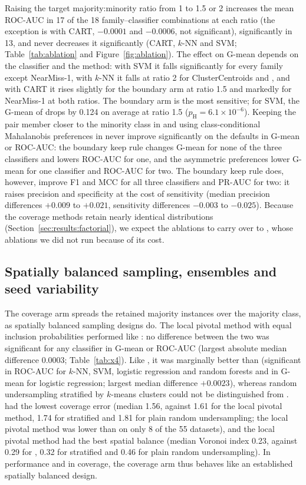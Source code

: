 Raising the target majority:minority ratio from 1 to 1.5 or 2 increases the mean ROC-AUC in 17 of the 18 family--classifier combinations at each ratio (the exception is \MUSCS{} with CART, $-0.0001$ and $-0.0006$, not significant), significantly in 13, and never decreases it significantly (CART, $k$-NN and SVM; Table~\ref{tab:ablation} and Figure~\ref{fig:ablation}). The effect on G-mean depends on the classifier and the method: with SVM it falls significantly for every family except NearMiss-1, with $k$-NN it falls at ratio 2 for ClusterCentroids and \MUSBO, and with CART it rises slightly for the boundary arm at ratio 1.5 and markedly for NearMiss-1 at both ratios. The boundary arm is the most sensitive; for SVM, the G-mean of \MUSBS{} drops by 0.124 on average at ratio 1.5 ($p_\mathrm{H}=6.1\times10^{-6}$). Keeping the pair member closer to the minority class in \MUSCS{} and using class-conditional Mahalanobis preferences in \MUSBS{} never improve significantly on the defaults in G-mean or ROC-AUC: the boundary keep rule changes G-mean for none of the three classifiers and lowers ROC-AUC for one, and the asymmetric preferences lower G-mean for one classifier and ROC-AUC for two. The boundary keep rule does, however, improve F1 and MCC for all three classifiers and PR-AUC for two: it raises precision and specificity at the cost of sensitivity (median precision differences $+0.009$ to $+0.021$, sensitivity differences $-0.003$ to $-0.025$). Because the coverage methods retain nearly identical distributions (Section~\ref{sec:results:factorial}), we expect the \MUSCS{} ablations to carry over to \MUSCO, whose ablations we did not run because of its cost.

\subsection{Spatially balanced sampling, ensembles and seed variability}\label{sec:results:lpm}

The coverage arm spreads the retained majority instances over the majority class, as spatially balanced sampling designs do. The local pivotal method \citep{grafstrom2012spatially} with equal inclusion probabilities performed like \MUSCS: no difference between the two was significant for any classifier in G-mean or ROC-AUC (largest absolute median difference 0.0003; Table~\ref{tab:x4}). Like \MUSCS, it was marginally better than \RUS{} (significant in ROC-AUC for $k$-NN, SVM, logistic regression and random forests and in G-mean for logistic regression; largest median difference $+0.0023$), whereas random undersampling stratified by $k$-means clusters could not be distinguished from \RUS. \MUSCS{} had the lowest coverage error (median 1.56, against 1.61 for the local pivotal method, 1.74 for stratified and 1.81 for plain random undersampling; the local pivotal method was lower than \MUSCS{} on only 8 of the 55 datasets), and the local pivotal method had the best spatial balance (median Voronoi index 0.23, against 0.29 for \MUSCS, 0.32 for stratified and 0.46 for plain random undersampling). In performance and in coverage, the coverage arm thus behaves like an established spatially balanced design.

